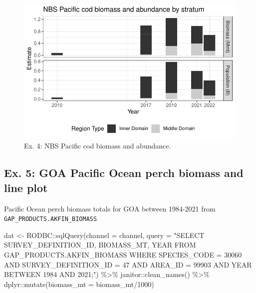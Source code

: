 \documentclass[
  letterpaper,
  oneside,
  open=any]{scrbook}
\newenvironment{Shaded}{\begin{snugshade}}{\end{snugshade}}
\newcommand{\AttributeTok}[1]{\textcolor[rgb]{0.40,0.45,0.13}{#1}}
\newcommand{\DecValTok}[1]{\textcolor[rgb]{0.68,0.00,0.00}{#1}}
\newcommand{\FunctionTok}[1]{\textcolor[rgb]{0.28,0.35,0.67}{#1}}
\newcommand{\NormalTok}[1]{\textcolor[rgb]{0.00,0.23,0.31}{#1}}
\newcommand{\OtherTok}[1]{\textcolor[rgb]{0.00,0.23,0.31}{#1}}
\newcommand{\SpecialCharTok}[1]{\textcolor[rgb]{0.37,0.37,0.37}{#1}}
\newcommand{\StringTok}[1]{\textcolor[rgb]{0.13,0.47,0.30}{#1}}
\begin{document}
\begin{figure}[H]

{\centering \includegraphics{content/akfin-oracle-sql-r_files/figure-pdf/test-4-fig-1.pdf}

}

\caption{Ex. 4: NBS Pacific cod biomass and abundance.}

\end{figure}

\hypertarget{ex.-5-goa-pacific-ocean-perch-biomass-and-line-plot}{%
\subsection{Ex. 5: GOA Pacific Ocean perch biomass and line
plot}\label{ex.-5-goa-pacific-ocean-perch-biomass-and-line-plot}}

Pacific Ocean perch biomass totals for GOA between 1984-2021 from
\texttt{GAP\_PRODUCTS.AKFIN\_BIOMASS}

\begin{Shaded}
\begin{Highlighting}[]
\NormalTok{dat }\OtherTok{\textless{}{-}}\NormalTok{ RODBC}\SpecialCharTok{::}\FunctionTok{sqlQuery}\NormalTok{(}\AttributeTok{channel =}\NormalTok{ channel, }
                       \AttributeTok{query =} 
\StringTok{"SELECT }
\StringTok{SURVEY\_DEFINITION\_ID, }
\StringTok{BIOMASS\_MT, }
\StringTok{YEAR}
\StringTok{FROM GAP\_PRODUCTS.AKFIN\_BIOMASS}
\StringTok{WHERE SPECIES\_CODE = 30060 }
\StringTok{AND SURVEY\_DEFINITION\_ID = 47 }
\StringTok{AND AREA\_ID = 99903 }
\StringTok{AND YEAR BETWEEN 1984 AND 2021;"}\NormalTok{) }\SpecialCharTok{\%\textgreater{}\%} 
\NormalTok{  janitor}\SpecialCharTok{::}\FunctionTok{clean\_names}\NormalTok{() }\SpecialCharTok{\%\textgreater{}\%} 
\NormalTok{  dplyr}\SpecialCharTok{::}\FunctionTok{mutate}\NormalTok{(}\AttributeTok{biomass\_mt =}\NormalTok{ biomass\_mt}\SpecialCharTok{/}\DecValTok{1000}\NormalTok{)}
\end{Highlighting}
\end{Shaded}
\end{document}
